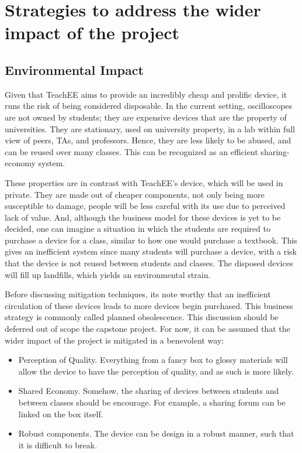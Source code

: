 \documentclass[letterpaper,12pt]{article}
\begin{document}
\section{Strategies to address the wider impact of the project}

\subsection{Environmental Impact}

Given that TeachEE aims to provide an incredibly cheap and prolific device, it
runs the risk of being considered disposable. In the current setting,
oscilloscopes are not owned by students; they are expensive devices that are the
property of universities. They are stationary, used on university property, in a
lab within full view of peers, TAs, and professors. Hence, they are less likely
to be abused, and can be reused over many classes. This can be recognized as an
efficient sharing-economy system.

These properties are in contrast with TeachEE's device, which will be used in
private. They are made out of cheaper components, not only being more
susceptible to damage, people will be less careful with its use due to perceived
lack of value. And, although the business model for these devices is yet to be
decided, one can imagine a situation in which the students are required to
purchase a device for a class, similar to how one would purchase a textbook.
This gives an inefficient system since many students will purchase a device,
with a risk that the device is not reused between students and classes. The
disposed devices will fill up landfills, which yields an environmental strain.

Before discussing mitigation techniques, its note worthy that an inefficient
circulation of these devices leads to more devices begin purchased. This
business strategy is commonly called planned obsolescence. This discussion
should be deferred out of scope the capstone project. For now, it can be assumed
that the wider impact of the project is mitigated in a benevolent way:

\begin{itemize}
    \item Perception of Quality. Everything from a fancy box to glossy materials
    will allow the device to have the perception of quality, and as such is more
    likely.
    \item Shared Economy. Somehow, the sharing of devices between students and
    between classes should be encourage. For example, a sharing forum can be
    linked on the box itself.
    \item Robust components. The device can be design in a robust manner, such
    that it is difficult to break.
\end{itemize}
\end{document}
